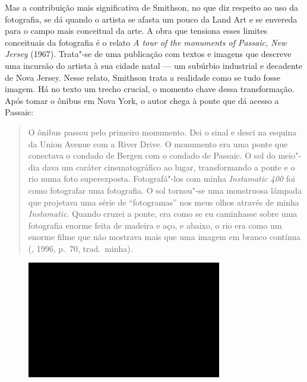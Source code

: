 Mas a contribuição mais significativa de Smithson, no que diz respeito
ao uso da fotografia, se dá quando o artista se afasta um pouco da Land
Art e se envereda para o campo mais conceitual da arte. A obra que
tensiona esses limites conceituais da fotografia é o relato \emph{A tour
of the monuments of Passaic, New Jersey} (1967). Trata"-se de uma
publicação com textos e imagens que descreve uma incursão do artista à
sua cidade natal --- um subúrbio industrial e decadente de Nova Jersey.
Nesse relato, Smithson trata a realidade como se tudo fosse imagem. Há
no texto um trecho crucial, o momento chave dessa transformação. Após
tomar o ônibus em Nova York, o autor chega à ponte que dá acesso a
Passaic:

\begin{quote}
O ônibus passou pelo primeiro monumento. Dei o sinal e desci na esquina
da Union Avenue com a River Drive. O monumento era uma ponte que
conectava o condado de Bergen com o condado de Passaic. O sol do meio"-dia dava um caráter cinematográfico ao lugar, transformando a ponte e o
rio numa foto superexposta. Fotografá"-los com minha \emph{Instamatic 400} foi
como fotografar uma fotografia. O sol tornou"-se uma monstruosa lâmpada
que projetava uma série de ``fotogramas'' nos meus olhos através de
minha \emph{Instamatic}. Quando cruzei a ponte, era como se eu caminhasse sobre
uma fotografia enorme feita de madeira e aço, e abaixo, o rio era como
um enorme filme que não mostrava mais que uma imagem em branco contínua
(, 1996, p.~70, trad.~minha).
\end{quote}

\begin{figure}[!ht]

\centering
 \includegraphics[width=85mm]{./imgs/im1.jpg}
\caption{\tiny{}}

\end{figure}

